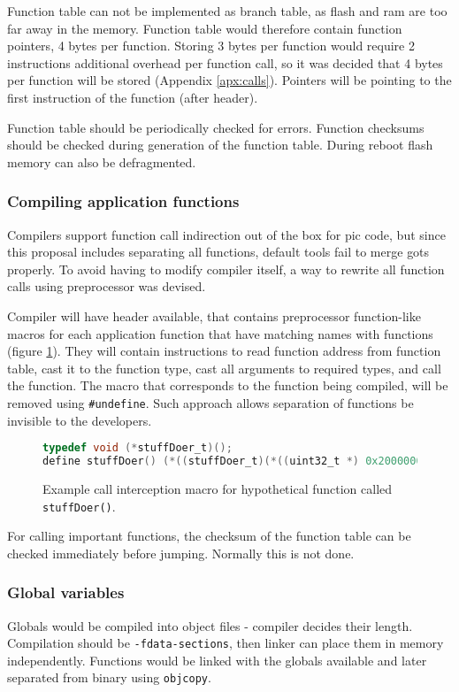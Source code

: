 Function table can not be implemented as branch table, as flash and ram are too far away in the memory. Function table would therefore contain function pointers, 4 bytes per function. Storing 3 bytes per function would require 2 instructions additional overhead per function call, so it was decided that 4 bytes per function will be stored (Appendix \ref{apx:calls}). Pointers will be pointing to the first instruction of the function (after header).

Function table should be periodically checked for errors. Function checksums should be checked during generation of the function table. During reboot flash memory can also be defragmented.

\subsubsection{Compiling application functions}

Compilers support function call indirection out of the box for \gls{pic} code, but since this proposal includes separating all functions, default tools fail to merge \glspl{got} properly. To avoid having to modify compiler itself, a way to rewrite all function calls using preprocessor was devised.

Compiler will have header available, that contains preprocessor function-like macros for each application function that have matching names with functions (figure \ref{fig:macro}). They will contain instructions to read function address from function table, cast it to the function type, cast all arguments to required types, and call the function.  The macro that corresponds to the function being compiled, will be removed using \texttt{\#undefine}. Such approach allows separation of functions be invisible to the developers.

\begin{figure} [htb]
\begin{lstlisting}[language=C]
typedef void (*stuffDoer_t)();
define stuffDoer() (*((stuffDoer_t)(*((uint32_t *) 0x20000000))))()
\end{lstlisting}
\caption{Example call interception macro for hypothetical function called \texttt{stuffDoer()}.}
\label{fig:macro}
\end{figure}

For calling important functions, the checksum of the function table can be checked immediately before jumping. Normally this is not done.

\subsubsection{Global variables}

Globals would be compiled into object files - compiler decides their length. Compilation should be  \texttt{-fdata-sections}, then linker can place them in memory independently. Functions would be linked with the globals available and later separated from binary using \texttt{objcopy}.
